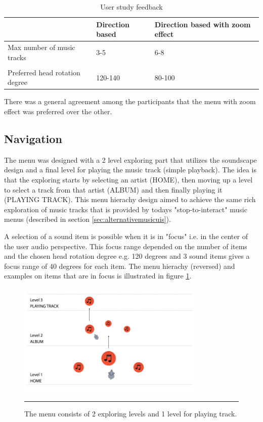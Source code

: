 \begin{table}[t] 
\scriptsize
\centering
\caption{User study feedback} %
\begin{tabular}{L{3cm}C{3cm}C{3cm}} \toprule
	 & Direction based & Direction based with zoom effect \\ \midrule
    Max number of music tracks   & 3-5 & 6-8 \\
    \\
    Preferred head rotation degree   & 120-140 & 80-100 \\ \bottomrule
\end{tabular}

\label{tab:pilotresults} 
\end{table}

There was a general agreement among the participants that the menu with zoom effect was preferred over the other.

\subsection{Navigation}
\label{sec:designnavigation}
The menu was designed with a 2 level exploring part that utilizes the soundscape design and a final level for playing the music track (simple playback). The idea is that the exploring starts by selecting an artist (HOME), then moving up a level to select a track from that artist (ALBUM) and then finally playing it (PLAYING TRACK). This menu hierachy design aimed to achieve the same rich exploration of music tracks that is provided by todays "stop-to-interact" music menus (described in section \ref{sec:alternativemusicuis}). 

A selection of a sound item is possible when it is in "focus" i.e. in the center of the user audio perspective. This focus range depended on the number of items and the chosen head rotation degree e.g. 120 degrees and 3 sound items gives a focus range of 40 degrees for each item. The menu hierachy (reversed) and examples on items that are in focus is illustrated in figure \ref{fig:navigation}.

\begin{figure}[b]
	\centering
		\includegraphics[width=0.8\textwidth,height=\textheight,keepaspectratio]{./Figures/navigation.png}
		\rule{35em}{0.5pt}
	\caption[Menu Hierachy]{The menu consists of 2 exploring levels and 1 level for playing track.}
	\label{fig:navigation}
\end{figure}

